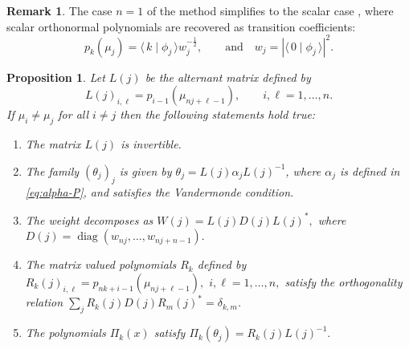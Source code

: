 \documentclass[a4paper,reqno]{amsart}
\DeclareMathOperator{\diag}{diag}
\newtheorem{proposition}[theorem]{Proposition}
\theoremstyle{definition}
\newtheorem{remark}[theorem]{Remark}
\numberwithin{equation}{section}
\newcommand{\bra}[1]{\langle\,{#1}}
\newcommand{\ket}[1]{\mid{#1}\,\rangle}
\begin{document}
\begin{remark}
The case $n=1$ of the method simplifies to the scalar case \cite{GranovskiiZhedanov86,Zhedanov96}, where scalar orthonormal polynomials are recovered as transition coefficients: 
\begin{equation}
\label{eq:scalar-transition-coeff}
p_{k}(\mu_j)=\bra{k}\ket{\phi_j} w_j^{-\frac{1}{2}},\qquad \text{and}\quad  w_j=|\bra{0}\ket{\phi_j}|^2.
\end{equation}
\end{remark} 
\begin{proposition}\label{prop:Vandermonde}
\label{prop:L-R}Let $L(j)$ be the alternant matrix defined by 
\begin{equation}
\label{eq:alternant-general}
L(j)_{i,\ell}=p_{i-1}(\mu_{nj+\ell-1}), \qquad i,\ell=1,\ldots, n. 
\end{equation}
If $\mu_i\neq \mu_j$ for all $i\neq j$ then the following statements hold true:
\begin{enumerate}
    \item The matrix $L(j)$ is invertible.
    \item The family $(\theta_j)_j$ is given by $\theta_j=L(j)\alpha_j L(j)^{-1}$, where $\alpha_j$ is defined in \eqref{eq:alpha-P}, and satisfies the Vandermonde condition.
    \item The weight decomposes as $W(j)=L(j)D(j)L(j)^\ast,$ where $D(j)=\diag(w_{nj},\ldots,w_{nj+n-1}).$ 
    \item The matrix valued polynomials $R_k$ defined by
    $R_k(j)_{i,\ell}=p_{nk+i-1}(\mu_{nj+\ell-1}),$ $i,\ell=1,\ldots, n, $ 
    satisfy the orthogonality relation $\sum_j R_k(j)D(j)R_m(j)^\ast=\delta_{k,m}$.
    \item The polynomials $\Pi_k(x)$ satisfy $\Pi_k(\theta_j)=R_k(j)L(j)^{-1}.$
\end{enumerate}
\end{proposition}
\end{document}

